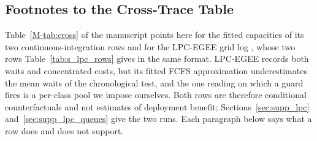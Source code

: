 \documentclass[mathematics,supfile,submit,moreauthors]{Definitions/mdpi}
\begin{document}
\subsection{Footnotes to the Cross-Trace Table}
\label{sec:supp_crossnotes}

Table~\ref*{M-tab:cross} of the manuscript points here for the fitted capacities of its two
continuous-integration rows and for the LPC-EGEE grid log \cite{lpc_egee_trace}, whose two
rows Table~\ref{tab:s_lpc_rows} gives in the same format. LPC-EGEE records both waits and
concentrated costs, but its fitted FCFS approximation underestimates the mean waits of the
chronological test, and the one reading on which a guard fires is a per-class pool we
impose ourselves. Both rows are therefore conditional counterfactuals and not estimates of
deployment benefit; Sections~\ref{sec:supp_lpc} and~\ref{sec:supp_lpc_queues} give the two
runs. Each paragraph below says what a row does and does not support.
\end{document}

